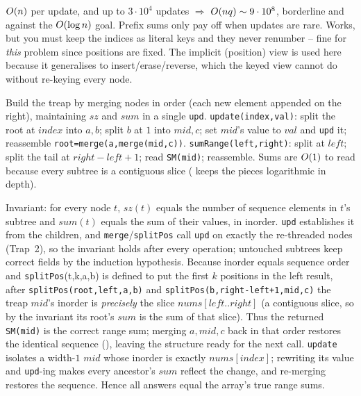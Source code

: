 \begin{thinkbox}
{$O(n)$ per update, and up to $3\cdot 10^{4}$ updates $\Rightarrow$ $O(nq)\sim 9\cdot 10^{8}$,
borderline \tle and against the $O(\log n)$ goal. Prefix sums only pay off when updates are rare.}
{Works, but you must keep the indices as literal keys and they never renumber -- fine for \emph{this}
problem since positions are fixed. The implicit (position) view is used here because it generalises to
insert/erase/reverse, which the keyed view cannot do without re-keying every node.}
\end{thinkbox}

Build the treap by merging nodes in order (each new element appended on the right), maintaining $\mathit{sz}$
and $\mathit{sum}$ in a single \texttt{upd}. \texttt{update(index,val)}: split the root at $\mathit{index}$
into $a,b$; split $b$ at $1$ into $mid,c$; set $mid$'s value to $\mathit{val}$ and \texttt{upd} it; reassemble
\texttt{root=merge(a,merge(mid,c))}. \texttt{sumRange(left,right)}: split at $\mathit{left}$; split the tail
at $\mathit{right}-\mathit{left}+1$; read \texttt{SM(mid)}; reassemble. Sums are $O(1)$ to read because
every subtree is a contiguous slice ( keeps the pieces logarithmic in depth).

\begin{proofbox}
Invariant: for every node $t$, $\mathit{sz}(t)$ equals the number of sequence elements in $t$'s subtree and
$\mathit{sum}(t)$ equals the sum of their values, in inorder. \texttt{upd} establishes it from the children,
and \texttt{merge}/\texttt{splitPos} call \texttt{upd} on exactly the re-threaded nodes (Trap~2), so the
invariant holds after every operation; untouched subtrees keep correct fields by the induction hypothesis.
Because inorder equals sequence order and \texttt{splitPos}(t,k,a,b) is defined to put the first $k$
positions in the left result, after \texttt{splitPos(root,left,a,b)} and
\texttt{splitPos(b,right-left+1,mid,c)} the treap $mid$'s inorder is \emph{precisely} the slice
$\mathit{nums[left..right]}$ (a contiguous slice, so by the invariant its root's $\mathit{sum}$ is the sum of
that slice). Thus the returned \texttt{SM(mid)} is the correct range sum; merging $a,mid,c$ back in that
order restores the identical sequence (), leaving the structure ready for the next
call. \texttt{update} isolates a width-$1$ $mid$ whose inorder is exactly $\mathit{nums[index]}$; rewriting
its value and \texttt{upd}-ing makes every ancestor's $\mathit{sum}$ reflect the change, and re-merging
restores the sequence. Hence all answers equal the array's true range sums. \end{proofbox}

